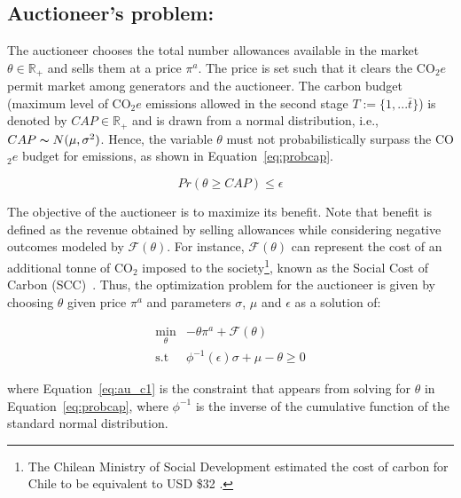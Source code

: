\documentclass[11pt, letterpaper]{article}
\begin{document}
\subsection{Auctioneer's problem:}\label{sec:auctioneer}
 The auctioneer chooses the total number allowances available in the market $\theta\in \mathbb{R}_+$ and sells them at a price $\pi^a$. The price is set such that it clears the CO$_2e$ permit market among generators and the auctioneer.  The carbon budget (maximum level of CO$_2e$ emissions allowed in the second stage $T:=\{1,...\bar{t}\}$) is denoted by  $CAP\in\mathbb{R}_+$ and is drawn from a normal distribution, i.e., $CAP \thicksim N(\mu, \sigma^2)$. Hence, the variable $\theta$ must not probabilistically surpass the CO$_2e$ budget for emissions, as shown in Equation~\ref{eq:probcap}.
 
\begin{equation}
    Pr(\theta \geq CAP) \leq \epsilon \label{eq:probcap}
\end{equation}

 The objective of the auctioneer is to maximize its benefit. Note that benefit is defined as the revenue obtained by selling allowances while considering negative outcomes modeled by $\mathcal{F}(\theta)$. For instance, $\mathcal{F}(\theta)$ can represent the cost of an additional tonne of CO$_2$ imposed to the society\footnote{The Chilean Ministry of Social Development estimated the cost of carbon for Chile to be equivalent to USD \$32 \cite{ChileSCC}.}, known as the Social Cost of Carbon (SCC)~\cite{feijoo2014design}. Thus, the optimization problem for the auctioneer is given by choosing $\theta$ given price $\pi^a$ and parameters $\sigma$, $\mu$ and $\epsilon$ as a solution of:

\begin{align}
    \min_{\theta} & -\theta \pi^{a}  + \mathcal{F}(\theta)   \label{eq:auc} \\
    \textrm{s.t \ } &  \phi^{-1}(\epsilon) \sigma + \mu - \theta  \geq 0 \label{eq:au_c1}
\end{align}

where Equation~\ref{eq:au_c1} is the constraint that appears from solving for $\theta$ in Equation~\ref{eq:probcap}, where $\phi^{-1}$ is the inverse of the cumulative function of the standard normal distribution. 

\end{document}

